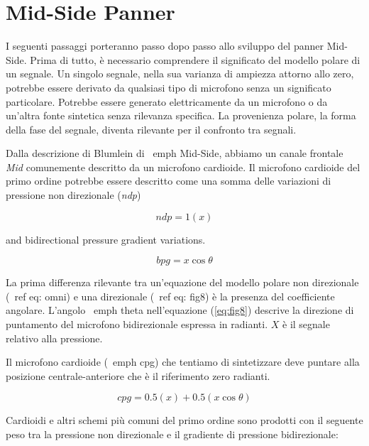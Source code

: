 \section{Mid-Side Panner}
\label{sec:mspanner}

I seguenti passaggi porteranno passo dopo passo allo sviluppo del panner
Mid-Side. Prima di tutto, è necessario comprendere il significato del modello
polare di un segnale. Un singolo segnale, nella sua varianza di ampiezza attorno
allo zero, potrebbe essere derivato da qualsiasi tipo di microfono senza un
significato particolare. Potrebbe essere generato elettricamente da un microfono
o da un'altra fonte sintetica senza rilevanza specifica. La provenienza polare,
la forma della fase del segnale, diventa rilevante per il confronto tra segnali.

Dalla descrizione di Blumlein di \ emph {Mid-Side}, abbiamo un canale frontale
\emph{Mid} comunemente descritto da un microfono cardioide. Il microfono
cardioide del primo ordine potrebbe essere descritto come una somma delle
variazioni di pressione non direzionale (\emph{ndp})

\begin{equation}
ndp = 1(x)
\label{eq:omni}
\end{equation}

and bidirectional pressure gradient variations.

\begin{equation}
bpg = x\cos\theta
\label{eq:fig8}
\end{equation}

La prima differenza rilevante tra un'equazione del modello polare non
direzionale (\ ref {eq: omni}) e una direzionale (\ ref {eq: fig8}) è la
presenza del coefficiente angolare. L'angolo \ emph {theta} nell'equazione
(\ref{eq:fig8}) descrive la direzione di puntamento del microfono bidirezionale
espressa in radianti. $ X $ è il segnale relativo alla pressione.

Il microfono cardioide (\ emph {cpg}) che tentiamo di sintetizzare deve puntare
alla posizione centrale-anteriore che è il riferimento zero radianti.

\begin{equation}
cpg = 0.5(x) + 0.5(x\cos\theta)
\label{eq:cardioid}
\end{equation}

Cardioidi e altri schemi più comuni del primo ordine sono prodotti con il
seguente peso tra la pressione non direzionale e il gradiente di pressione
bidirezionale:

